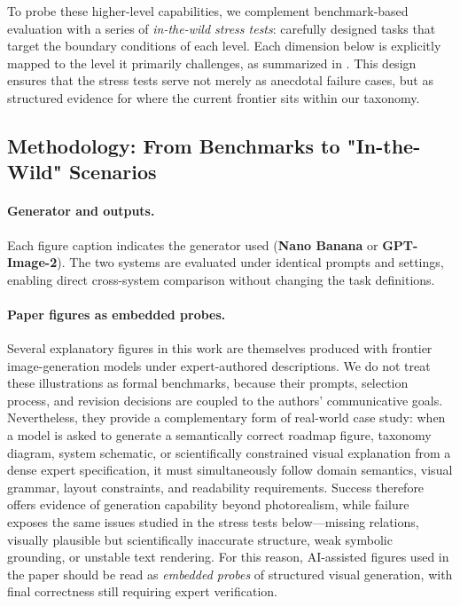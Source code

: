 \documentclass{llmxive}
\begin{document}
To probe these higher-level capabilities, we complement benchmark-based evaluation with a series of \emph{in-the-wild stress tests}: carefully designed tasks that target the boundary conditions of each level. Each dimension below is explicitly mapped to the level it primarily challenges, as summarized in . This design ensures that the stress tests serve not merely as anecdotal failure cases, but as structured evidence for where the current frontier sits within our taxonomy.

\subsection{Methodology: From Benchmarks to "In-the-Wild" Scenarios}

\paragraph{Generator and outputs.}
Each figure caption indicates the generator used (\textbf{Nano Banana} or \textbf{GPT-Image-2}). The two systems are evaluated under identical prompts and settings, enabling direct cross-system comparison without changing the task definitions.

\paragraph{Paper figures as embedded probes.}
Several explanatory figures in this work are themselves produced with frontier image-generation models under expert-authored descriptions. We do not treat these illustrations as formal benchmarks, because their prompts, selection process, and revision decisions are coupled to the authors' communicative goals. Nevertheless, they provide a complementary form of real-world case study: when a model is asked to generate a semantically correct roadmap figure, taxonomy diagram, system schematic, or scientifically constrained visual explanation from a dense expert specification, it must simultaneously follow domain semantics, visual grammar, layout constraints, and readability requirements. Success therefore offers evidence of generation capability beyond photorealism, while failure exposes the same issues studied in the stress tests below---missing relations, visually plausible but scientifically inaccurate structure, weak symbolic grounding, or unstable text rendering. For this reason, AI-assisted figures used in the paper should be read as \emph{embedded probes} of structured visual generation, with final correctness still requiring expert verification.
\end{document}
